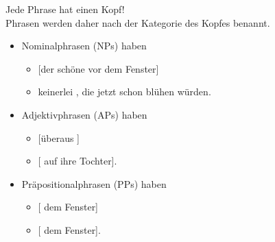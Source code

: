 \begin{frame}
  {Jede Phrase hat einen Kopf!}
  \onslide<+->
  \onslide<+->
  \\
  \onslide<+->
  \Halbzeile
  Phrasen werden daher nach der Kategorie des Kopfes benannt.\\
  \Zeile
  \begin{itemize}[<+->]
    \item \alert{Nominalphrasen} (NPs) haben 
      \begin{itemize}[<+->]
        \item \alert{[der schöne  vor dem Fenster]}
        \item {} \alert{keinerlei , die jetzt schon blühen würden}.
      \end{itemize}
      \Halbzeile
    \item \alert{Adjektivphrasen} (APs) haben 
      \begin{itemize}[<+->]
        \item {} \alert{[überaus ]} 
        \item {} \alert{[ auf ihre Tochter]}.
      \end{itemize}
      \Halbzeile
    \item \alert{Präpositionalphrasen} (PPs) haben 
      \begin{itemize}[<+->]
        \item {} \alert{[ dem Fenster]}
        \item {} \alert{[ dem Fenster]}.
      \end{itemize}
  \end{itemize}
\end{frame}



